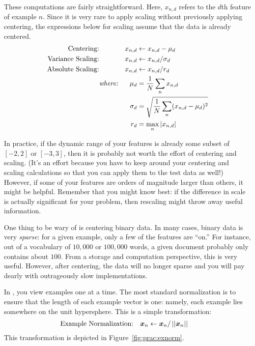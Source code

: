 
These computations are fairly straightforward.  Here, $x_{n,d}$ refers
to the $d$th feature of example $n$.  Since it is very rare to apply
scaling without previously applying centering, the expressions below
for scaling assume that the data is already centered.
\begin{align}
\text{Centering:} && x_{n,d} &\leftarrow x_{n,d} - \mu_d \\
\text{Variance Scaling:} && x_{n,d} &\leftarrow x_{n,d} / \sigma_d \\
\text{Absolute Scaling:} && x_{n,d} &\leftarrow x_{n,d} / r_d \\
&\textit{where:}
& \mu_d &= \frac 1 N \sum_n x_{n,d} \\
&& \sigma_d &= \sqrt{ \frac 1 N \sum_n (x_{n,d} - \mu_d)^2 } \\
&& r_d   &= \max_n \left\vert x_{n,d} \right\vert
\end{align}


In practice, if the dynamic range of your features is already some
subset of $[-2,2]$ or $[-3,3]$, then it is probably not worth the
effort of centering and scaling.  (It's an effort because you have to
keep around your centering and scaling calculations so that you can
apply them to the test data as well!)  However, if some of your
features are orders of magnitude larger than others, it might be
helpful.  Remember that you might know best: if the difference in
scale is actually significant for your problem, then rescaling might
throw away useful information.

One thing to be wary of is centering binary data.  In many cases,
binary data is very \emph{sparse}: for a given example, only a few of
the features are ``on.''  For instance, out of a vocabulary of
$10,000$ or $100,000$ words, a given document probably only contains
about $100$.  From a storage and computation perspective, this is very
useful.  However, after centering, the data will no longer sparse and
you will pay dearly with outrageously slow implementations.


In , you view examples one at a time.
The most standard normalization is to ensure that the length of each
example vector is one: namely, each example lies somewhere on the unit
hypersphere.  This is a simple transformation:
\begin{align}
\text{Example Normalization:} && {\boldsymbol{x}}_{n} &\leftarrow {\boldsymbol{x}}_{n} / \left\vert\left\vert {\boldsymbol{x}}_n \right\vert\right\vert
\end{align}
This transformation is depicted in Figure~\ref{fig:prac:exnorm}.

